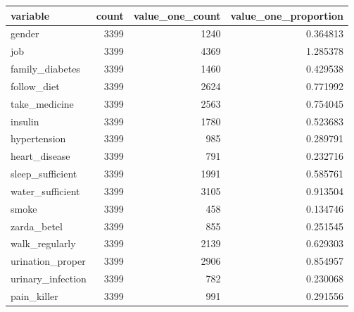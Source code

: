 \begin{tabular}{lrrr}
\toprule
variable & count & value\_one\_count & value\_one\_proportion \\
\midrule
gender & 3399 & 1240 & 0.364813 \\
job & 3399 & 4369 & 1.285378 \\
family\_diabetes & 3399 & 1460 & 0.429538 \\
follow\_diet & 3399 & 2624 & 0.771992 \\
take\_medicine & 3399 & 2563 & 0.754045 \\
insulin & 3399 & 1780 & 0.523683 \\
hypertension & 3399 & 985 & 0.289791 \\
heart\_disease & 3399 & 791 & 0.232716 \\
sleep\_sufficient & 3399 & 1991 & 0.585761 \\
water\_sufficient & 3399 & 3105 & 0.913504 \\
smoke & 3399 & 458 & 0.134746 \\
zarda\_betel & 3399 & 855 & 0.251545 \\
walk\_regularly & 3399 & 2139 & 0.629303 \\
urination\_proper & 3399 & 2906 & 0.854957 \\
urinary\_infection & 3399 & 782 & 0.230068 \\
pain\_killer & 3399 & 991 & 0.291556 \\
\bottomrule
\end{tabular}
